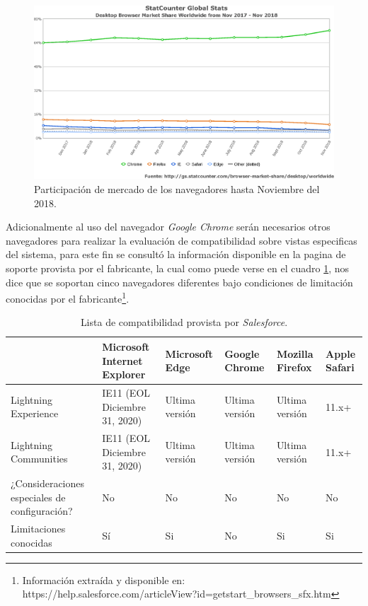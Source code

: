 \begin{figure}
\centering
\includegraphics[width=1.0\textwidth]{graphics/compatibilidad.eps}
\caption{Participación de mercado de los navegadores hasta Noviembre del 2018.}
\label{software}
\end{figure}

Adicionalmente al uso del navegador \emph{Google Chrome} serán necesarios
otros navegadores para realizar la evaluación de compatibilidad sobre
vistas especificas del sistema, para este fin se consultó la información
disponible en la pagina de soporte provista por el fabricante, la cual como
puede verse en el cuadro \ref{soporte_navegadores}, nos dice que se soportan
cinco navegadores diferentes bajo condiciones de limitación conocidas por el
fabricante\footnote{Información extraída y disponible en:
https://help.salesforce.com/articleView?id=getstart\_browsers\_sfx.htm}.

\begin{table}
\centering
\begin{tabular}{|p{5.5cm}|p{1.7cm}|p{1.7cm}|p{1.7cm}|p{1.7cm}|p{1.7cm}|}
\hline
& \textbf{Microsoft Internet Explorer} & \textbf{Microsoft Edge} & \textbf{Google Chrome} & \textbf{Mozilla Firefox} & \textbf{Apple Safari} \\
\hline
Lightning Experience & IE11 (EOL Diciembre 31, 2020) & Ultima versión & Ultima versión & Ultima versión & 11.x+ \\
Lightning Communities & IE11 (EOL Diciembre 31, 2020) & Ultima versión & Ultima versión & Ultima versión & 11.x+ \\
¿Consideraciones especiales de configuración? & No & No & No & No & No \\
Limitaciones conocidas & Sí & Si & No & Si & Si \\
\hline
\end{tabular}
\caption{Lista de compatibilidad provista por \emph{Salesforce}.}
\label{soporte_navegadores}
\end{table}

